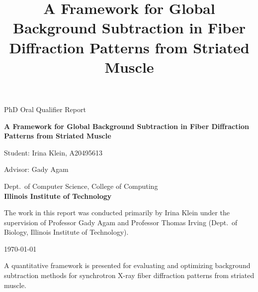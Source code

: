 \documentclass[iucr]{iucrjournals}
\title{A Framework for Global Background Subtraction in Fiber Diffraction Patterns from Striated Muscle}
\author{}
\date{}
\begin{document}
\singlespacing

\nolinenumbers
\begin{titlepage}
    \centering

    {\Large PhD Oral Qualifier Report\par}



    \vspace{3cm}

    {\LARGE\bfseries A Framework for Global Background Subtraction in Fiber Diffraction Patterns from Striated Muscle\par}

    \vspace{3cm}

    \vspace{0.5cm}
    Student: Irina Klein, A20495613\par

    \vspace{1cm}

    {\large Advisor: Gady Agam\par}
    \vspace{1cm}

    
	\footnotesize{Dept.~of Computer Science, College of Computing}\\[.5ex] \large{\bf Illinois Institute of Technology}

    \vspace{2cm}

    The work in this report was conducted primarily by Irina Klein under the supervision of Professor Gady Agam and Professor Thomas Irving (Dept.~of Biology, Illinois Institute of Technology). \par

    \vspace{2cm}


    \vfill

    {\large\today\par}
\end{titlepage}


\setcounter{page}{1}

\begin{synopsis}
A quantitative framework is presented for evaluating and optimizing background subtraction methods for synchrotron X-ray fiber diffraction patterns from striated muscle.
\end{synopsis}
\end{document}
